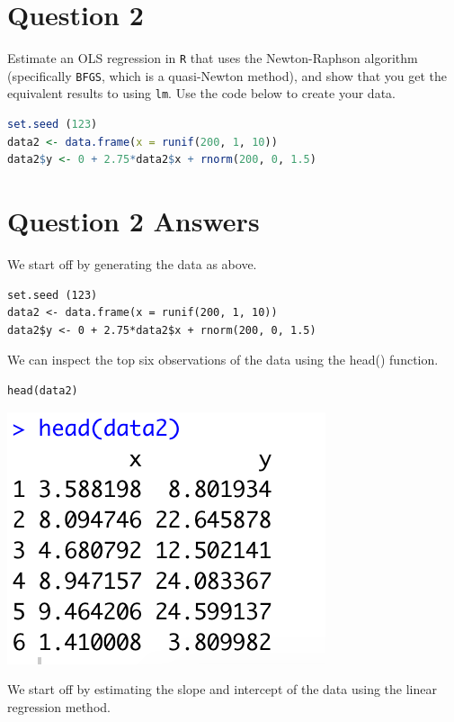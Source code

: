 \documentclass[12pt,letterpaper]{article}
\begin{document}
\pagebreak
\section*{Question 2}
\noindent Estimate an OLS regression in \texttt{R} that uses the Newton-Raphson algorithm (specifically \texttt{BFGS}, which is a quasi-Newton method), and show that you get the equivalent results to using \texttt{lm}. Use the code below to create your data.
\vspace{.5cm}
\begin{lstlisting}[language=R]
set.seed (123)
data2 <- data.frame(x = runif(200, 1, 10))
data2$y <- 0 + 2.75*data2$x + rnorm(200, 0, 1.5)
\end{lstlisting}

\pagebreak

\section*{Question 2 Answers}

\noindent We start off by generating the data as above.

\begin{lstlisting}
set.seed (123)
data2 <- data.frame(x = runif(200, 1, 10))
data2$y <- 0 + 2.75*data2$x + rnorm(200, 0, 1.5)
\end{lstlisting}

\noindent We can inspect the top six observations of the data using the head() function.

\begin{lstlisting}
head(data2)
\end{lstlisting}

\includegraphics{head(data2).png}

\noindent We start off by estimating the slope and intercept of the data using the linear regression method.
\end{document}
